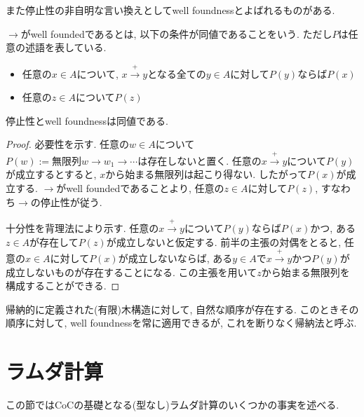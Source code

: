 \documentclass[12pt]{ltjsarticle}
\begin{document}
また停止性の非自明な言い換えとしてwell foundnessとよばれるものがある.

\begin{defn}
$\rightarrow$がwell foundedであるとは, 以下の条件が同値であることをいう. ただし$P$は任意の述語を表している.
 \begin{itemize}
  \item 任意の$x \in A$について, $x \xrightarrow{+} y$となる全ての$y \in A$に対して$P(y)$ならば$P(x)$
  \item 任意の$z \in A$について$P(z)$
 \end{itemize}
\end{defn}

\begin{thm}
 停止性とwell foundnessは同値である.
\end{thm}

\begin{proof}
 必要性を示す. 任意の$w \in A$について$P(w):= \text{無限列} w \rightarrow w_1 \rightarrow \cdots \text{は存在しない}$と置く. 任意の$x \xrightarrow{+} y$について$P(y)$が成立するとすると, $x$から始まる無限列は起こり得ない. したがって$P(x)$が成立する. $\rightarrow$がwell foundedであることより, 任意の$z \in A$に対して$P(z)$, すなわち$\rightarrow$の停止性が従う.
 
 十分性を背理法により示す. 任意の$x \xrightarrow{+} y$について$P(y)$ならば$P(x)$かつ, ある$z \in A$が存在して$P(z)$が成立しないと仮定する. 前半の主張の対偶をとると, 任意の$x \in A$に対して$P(x)$が成立しないならば, ある$y \in A$で$x \xrightarrow{+} y$かつ$P(y)$が成立しないものが存在することになる. この主張を用いて$z$から始まる無限列を構成することができる.
\end{proof}

\begin{rem}
帰納的に定義された(有限)木構造に対して, 自然な順序が存在する.
このときその順序に対して, well foundnessを常に適用できるが, これを断りなく帰納法と呼ぶ.
\end{rem}


\section{ラムダ計算}\label{lambda}
この節ではCoCの基礎となる(型なし)ラムダ計算のいくつかの事実を述べる.
\end{document}
